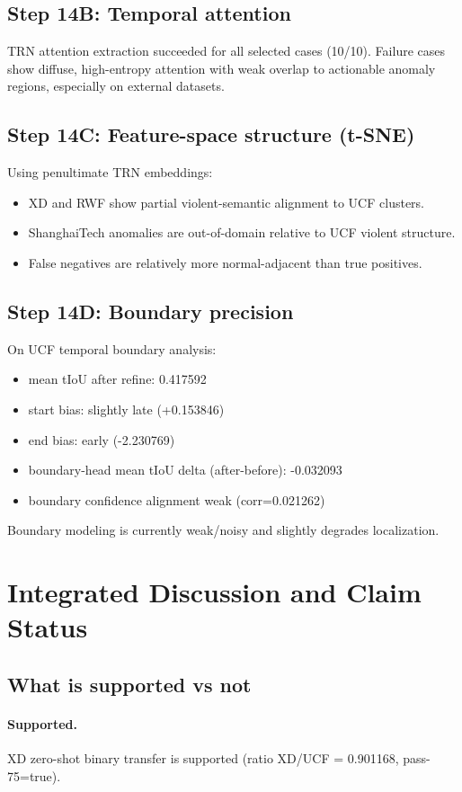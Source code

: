 \documentclass[11pt]{article}
\begin{document}
\subsection{Step 14B: Temporal attention}
TRN attention extraction succeeded for all selected cases (10/10). Failure cases show diffuse, high-entropy attention with weak overlap to actionable anomaly regions, especially on external datasets.

\subsection{Step 14C: Feature-space structure (t-SNE)}
Using penultimate TRN embeddings:
\begin{itemize}
  \item XD and RWF show partial violent-semantic alignment to UCF clusters.
  \item ShanghaiTech anomalies are out-of-domain relative to UCF violent structure.
  \item False negatives are relatively more normal-adjacent than true positives.
\end{itemize}

\subsection{Step 14D: Boundary precision}
On UCF temporal boundary analysis:
\begin{itemize}
  \item mean tIoU after refine: 0.417592
  \item start bias: slightly late (+0.153846)
  \item end bias: early (-2.230769)
  \item boundary-head mean tIoU delta (after-before): -0.032093
  \item boundary confidence alignment weak (corr=0.021262)
\end{itemize}
Boundary modeling is currently weak/noisy and slightly degrades localization.

\section{Integrated Discussion and Claim Status}
\subsection{What is supported vs not}
\paragraph{Supported.}
XD zero-shot binary transfer is supported (ratio XD/UCF = 0.901168, pass-75=true).
\end{document}
